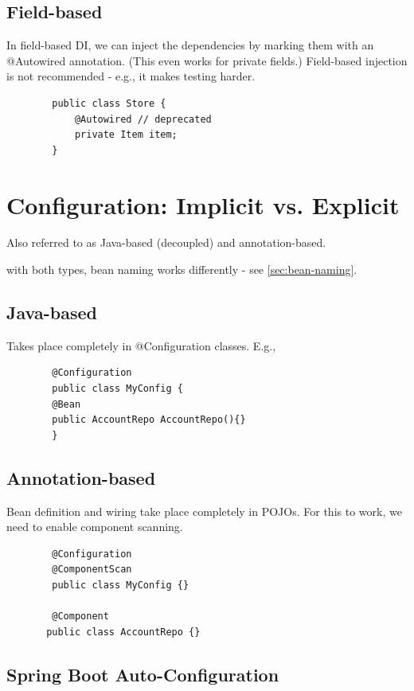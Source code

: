 \documentclass{scrartcl}
\begin{document}
\subsection{Field-based}

    In field-based DI, we can inject the dependencies by marking them with an @Autowired annotation. (This even works for private fields.)
    Field-based injection is not recommended - e.g., it makes testing harder.

    \begin{lstlisting}
        public class Store {
            @Autowired // deprecated
            private Item item;
        }
    \end{lstlisting}


\section{Configuration: Implicit vs. Explicit}

    Also referred to as Java-based (decoupled) and annotation-based.

    with both types, bean naming works differently - see \ref{sec:bean-naming}.

\subsection{Java-based}

    Takes place completely in @Configuration classes. E.g.,

    \begin{lstlisting}
        @Configuration
        public class MyConfig {
        @Bean
        public AccountRepo AccountRepo(){}
        }
    \end{lstlisting}

\subsection{Annotation-based}

    Bean definition and wiring take place completely in POJOs. For this to work, we need to enable component scanning.

    \begin{lstlisting}
        @Configuration
        @ComponentScan
        public class MyConfig {}

        @Component
       public class AccountRepo {}
    \end{lstlisting}


\subsection{Spring Boot Auto-Configuration}
\end{document}
